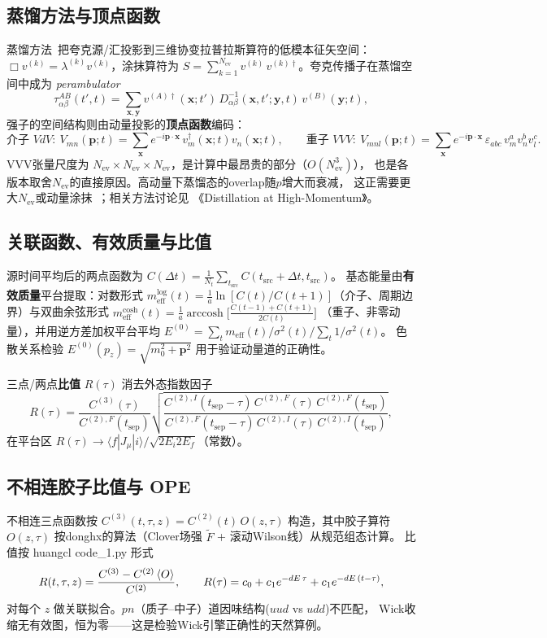 \documentclass[11pt,a4paper]{article}
\newcommand{\meff}{m_{\mathrm{eff}}}
\newcommand{\Nev}{N_{\mathrm{ev}}}
\newcommand{\Nt}{N_t}
\newcommand{\tsep}{t_{\mathrm{sep}}}
\newcommand{\tsrc}{t_{\mathrm{src}}}
\newcommand{\CtwoI}{C^{(2),I}}
\newcommand{\CtwoF}{C^{(2),F}}
\newcommand{\Cthree}{C^{(3)}}
\newcommand{\Em}{E^{(0)}}
\newcommand{\EmP}{E^{(0)}(p_z)}
\begin{document}
\subsection{蒸馏方法与顶点函数}
蒸馏方法~\cite{peardon2009}把夸克源/汇投影到三维协变拉普拉斯算符的低模本征矢空间：
$\Box v^{(k)}=\lambda^{(k)}v^{(k)}$，涂抹算符为
$S=\sum_{k=1}^{\Nev} v^{(k)}\,v^{(k)\dagger}$。夸克传播子在蒸馏空间中成为
\emph{perambulator}
\begin{equation}
\tau_{\alpha\beta}^{AB}(t',t)=\sum_{\bm{x},\bm{y}}
v^{(A)\dagger}(\bm{x};t')\,D^{-1}_{\alpha\beta}(\bm{x},t';\bm{y},t)\,v^{(B)}(\bm{y};t),
\end{equation}
强子的空间结构则由动量投影的\textbf{顶点函数}编码：
\begin{equation}
\text{介子 } VdV:\ V_{mn}(\bm{p};t)=\sum_{\bm{x}}e^{-i\bm{p}\cdot\bm{x}}\,v_m^\dagger(\bm{x};t)v_n(\bm{x};t),
\qquad
\text{重子 } VVV:\ V_{mnl}(\bm{p};t)=\sum_{\bm{x}}e^{-i\bm{p}\cdot\bm{x}}\,
\varepsilon_{abc}\,v_m^{a}v_n^{b}v_l^{c}.
\label{eq:vertices}
\end{equation}
VVV张量尺度为 $\Nev\times\Nev\times\Nev$，是计算中最昂贵的部分（$O(\Nev^3)$），
也是各版本取舍$\Nev$的直接原因。高动量下蒸馏态的overlap随$p$增大而衰减，
这正需要更大$\Nev$或动量涂抹~\cite{bali2016}；相关方法讨论见
《Distillation at High-Momentum》。

\subsection{关联函数、有效质量与比值}
源时间平均后的两点函数为 $C(\Delta t)=\tfrac{1}{\Nt}\sum_{\tsrc}C(\tsrc+\Delta t,\tsrc)$。
基态能量由\textbf{有效质量}平台提取：对数形式
$\meff^{\mathrm{log}}(t)=\tfrac1a\ln[C(t)/C(t+1)]$（介子、周期边界）与双曲余弦形式
$\meff^{\mathrm{cosh}}(t)=\tfrac1a\operatorname{arccosh}\bigl[\frac{C(t-1)+C(t+1)}{2C(t)}\bigr]$
（重子、非零动量），并用逆方差加权平台平均
$\Em=\sum_t \meff(t)/\sigma^2(t)\big/\sum_t 1/\sigma^2(t)$。
色散关系检验 $\EmP=\sqrt{m_0^2+\bm{p}^2}$ 用于验证动量道的正确性。

三点/两点\textbf{比值} $R(\tau)$ 消去外态指数因子
\begin{equation}
R(\tau)=\frac{\Cthree(\tau)}{\CtwoF(\tsep)}
\sqrt{\frac{\CtwoI(\tsep-\tau)\,\CtwoF(\tau)\,\CtwoF(\tsep)}
            {\CtwoF(\tsep-\tau)\,\CtwoI(\tau)\,\CtwoI(\tsep)}},
\label{eq:ratio}
\end{equation}
在平台区 $R(\tau)\to\langle f|J_\mu|i\rangle/\sqrt{2E_i2E_f}$（常数）。

\subsection{不相连胶子比值与 OPE}
不相连三点函数按 $C^{(3)}(t,\tau,z)=C^{(2)}(t)\,O(z,\tau)$ 构造，其中胶子算符
$O(z,\tau)$ 按donghx的算法（Clover场强 $\tilde{F}$ + 滚动Wilson线）从规范组态计算。
比值按 huangcl code\_1.py 形式
\begin{equation}
R(t,\tau,z)=\frac{C^{(3)}-C^{(2)}\braket{O}}{C^{(2)}},\qquad
R(\tau)=c_0+c_1e^{-dE\,\tau}+c_1e^{-dE\,(t-\tau)},
\label{eq:code1}
\end{equation}
对每个 $z$ 做关联拟合。$pn$（质子--中子）道因味结构($uud$ vs $udd$)不匹配，
Wick收缩无有效图，恒为零——这是检验Wick引擎正确性的天然算例。
\end{document}
